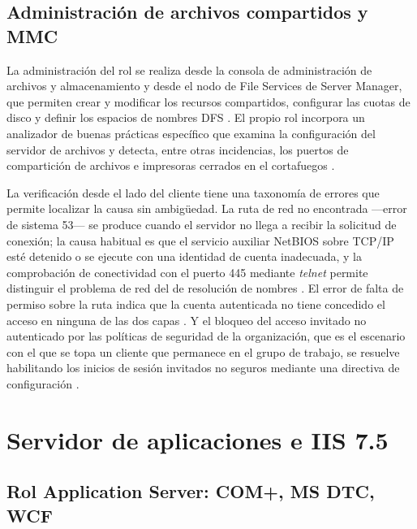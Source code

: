 \documentclass[12pt]{article}
\begin{document}
\subsection{Administración de archivos compartidos y MMC}
\label{sec:administracionArchivos}

La administración del rol se realiza desde la consola de administración de archivos y almacenamiento y desde el nodo de File Services de Server Manager, que permiten crear y modificar los recursos compartidos, configurar las cuotas de disco y definir los espacios de nombres DFS \parencite{microsoftFileServices2008r2}. El propio rol incorpora un analizador de buenas prácticas específico que examina la configuración del servidor de archivos y detecta, entre otras incidencias, los puertos de compartición de archivos e impresoras cerrados en el cortafuegos \parencite{microsoftSmbPorts} \parencite{microsoftFileServices2008r2}.

La verificación desde el lado del cliente tiene una taxonomía de errores que permite localizar la causa sin ambigüedad. La ruta de red no encontrada ---error de sistema 53--- se produce cuando el servidor no llega a recibir la solicitud de conexión; la causa habitual es que el servicio auxiliar NetBIOS sobre TCP/IP esté detenido o se ejecute con una identidad de cuenta inadecuada, y la comprobación de conectividad con el puerto 445 mediante \textit{telnet} permite distinguir el problema de red del de resolución de nombres \parencite{microsoftSharedFolderAccess}. El error de falta de permiso sobre la ruta indica que la cuenta autenticada no tiene concedido el acceso en ninguna de las dos capas \parencite{microsoftSharedFolderAccess}. Y el bloqueo del acceso invitado no autenticado por las políticas de seguridad de la organización, que es el escenario con el que se topa un cliente que permanece en el grupo de trabajo, se resuelve habilitando los inicios de sesión invitados no seguros mediante una directiva de configuración \parencite{microsoftSharedFolderAccess}.

\section{Servidor de aplicaciones e IIS 7.5}
\label{sec:servidorAplicacionesIis}

\subsection{Rol Application Server: COM+, MS DTC, WCF}
\label{sec:rolApplicationServer}
\end{document}
